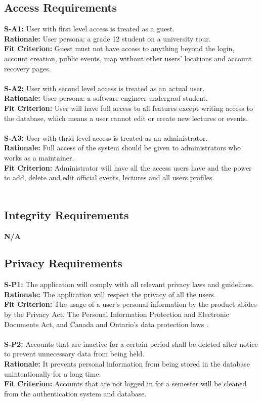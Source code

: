 \documentclass[12pt]{article}
\begin{document}
\subsection{Access Requirements}
  \textbf{S-A1:} User with first level access is treated as a guest.\\
  \textbf{Rationale:} User persona: a grade 12 student on a university tour.\\
  \textbf{Fit Criterion:} Guest must not have access to anything beyond the login, account creation, public events, map without other users' locations and account recovery pages. \\\\
  \textbf{S-A2:} User with second level access is treated as an actual user.\\
  \textbf{Rationale:} User persona: a software engineer undergrad student.\\
  \textbf{Fit Criterion:} User will have full access to all features except writing access to the database, which means a user cannot edit or create new lectures or events. \\\\
  \textbf{S-A3:} User with thrid level access is treated as an administrator.\\
  \textbf{Rationale:} Full access of the system should be given to administrators who works as a maintainer.\\
  \textbf{Fit Criterion:} Administrator will have all the access users have and the power to add, delete and edit official events, lectures and all users profiles.\\\\

\subsection{Integrity Requirements}
  \textbf{N/A}\\

\subsection{Privacy Requirements}
  \textbf{S-P1:} The application will comply with all relevant privacy laws and guidelines.\\
  \textbf{Rationale:} The application will respect the privacy of all the users.\\
  \textbf{Fit Criterion:} The usage of a user’s personal information by the product abides by the Privacy Act, The Personal Information Protection and Electronic Documents Act, and Canada and Ontario’s data protection laws \cite{Legislative Services} \cite{CFLC}.\\\\
  \textbf{S-P2:} Accounts that are inactive for a certain period shall be deleted after notice to prevent unnecessary data from being held.\\
  \textbf{Rationale:} It prevents personal information from being stored in the database unintentionally for a long time.\\
  \textbf{Fit Criterion:} Accounts that are not logged in for a semester will be cleaned from the authentication system and database.
\end{document}
